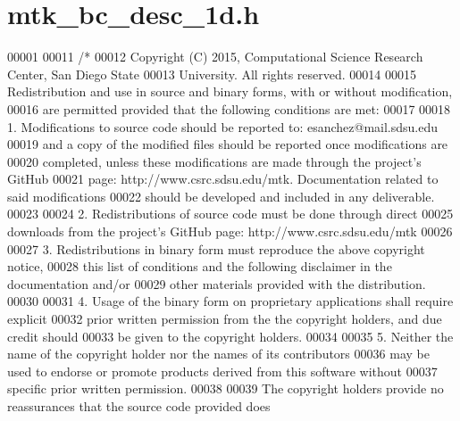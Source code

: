\hypertarget{mtk__bc__desc__1d_8h_source}{\section{mtk\+\_\+bc\+\_\+desc\+\_\+1d.\+h}
\label{mtk__bc__desc__1d_8h_source}
}

\begin{DoxyCode}
00001 
00011 \textcolor{comment}{/*}
00012 \textcolor{comment}{Copyright (C) 2015, Computational Science Research Center, San Diego State}
00013 \textcolor{comment}{University. All rights reserved.}
00014 \textcolor{comment}{}
00015 \textcolor{comment}{Redistribution and use in source and binary forms, with or without modification,}
00016 \textcolor{comment}{are permitted provided that the following conditions are met:}
00017 \textcolor{comment}{}
00018 \textcolor{comment}{1. Modifications to source code should be reported to: esanchez@mail.sdsu.edu}
00019 \textcolor{comment}{and a copy of the modified files should be reported once modifications are}
00020 \textcolor{comment}{completed, unless these modifications are made through the project's GitHub}
00021 \textcolor{comment}{page: http://www.csrc.sdsu.edu/mtk. Documentation related to said modifications}
00022 \textcolor{comment}{should be developed and included in any deliverable.}
00023 \textcolor{comment}{}
00024 \textcolor{comment}{2. Redistributions of source code must be done through direct}
00025 \textcolor{comment}{downloads from the project's GitHub page: http://www.csrc.sdsu.edu/mtk}
00026 \textcolor{comment}{}
00027 \textcolor{comment}{3. Redistributions in binary form must reproduce the above copyright notice,}
00028 \textcolor{comment}{this list of conditions and the following disclaimer in the documentation and/or}
00029 \textcolor{comment}{other materials provided with the distribution.}
00030 \textcolor{comment}{}
00031 \textcolor{comment}{4. Usage of the binary form on proprietary applications shall require explicit}
00032 \textcolor{comment}{prior written permission from the the copyright holders, and due credit should}
00033 \textcolor{comment}{be given to the copyright holders.}
00034 \textcolor{comment}{}
00035 \textcolor{comment}{5. Neither the name of the copyright holder nor the names of its contributors}
00036 \textcolor{comment}{may be used to endorse or promote products derived from this software without}
00037 \textcolor{comment}{specific prior written permission.}
00038 \textcolor{comment}{}
00039 \textcolor{comment}{The copyright holders provide no reassurances that the source code provided does}

\end{DoxyCode}

